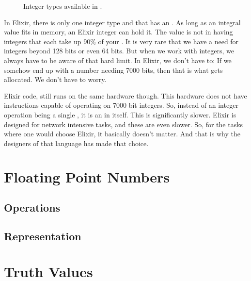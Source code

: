 
\begin{figure}[tbp]
  
  \caption{Integer types available in \csharp.}
  \label{fig:prim:int:csharp:types}
\end{figure}



In Elixir, there is only one integer type and that has an . As long as an integral value fits in memory, an Elixir integer can hold it. The value is not in having integers that each take up 90\% of your . It is very rare that we have a need for integers beyond 128 bits or even 64 bits. But when we work with  integers, we always have to be aware of that hard limit. In Elixir, we don't have to: If we somehow end up with a number needing 7000 bits, then that is what gets allocated. We don't have to worry.

Elixir code, still runs on the same hardware though. This hardware does not have instructions capable of operating on 7000 bit integers. So, instead of an integer operation being a single , it is an  in itself. This is significantly slower. Elixir is designed for network intensive tasks, and these are even slower. So, for the tasks where one would choose Elixir, it basically doesn't matter. And that is why the designers of that language has made that choice.

\section{Floating Point Numbers}
\label{primitives:float}

\subsection{Operations}
\subsection{Representation}
\csharpsubsection{\csharp}

\section{Truth Values}

